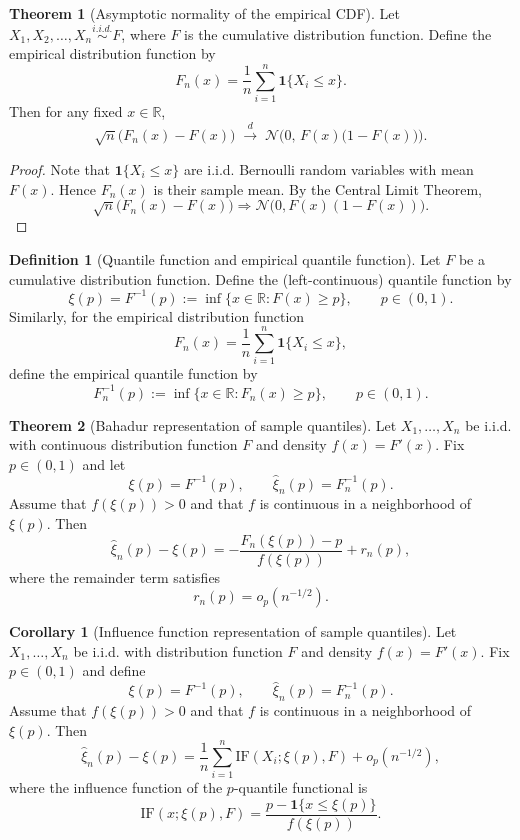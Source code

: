 \documentclass[11pt]{article}
\theoremstyle{definition}
\newtheorem{defn}{Definition}[section]
\newtheorem{theo}{Theorem}[section]
\newtheorem{corollary}{Corollary}[section]
\begin{document}
\begin{theo}[Asymptotic normality of the empirical CDF]
Let $X_1, X_2, \dots, X_n \stackrel{i.i.d.}{\sim} F$, where $F$ is the cumulative distribution function.
Define the empirical distribution function by
\[
F_n(x) = \frac{1}{n} \sum_{i=1}^n \mathbf{1}\{X_i \le x\}.
\]
Then for any fixed $x \in \mathbb{R}$,
\[
\sqrt{n}\big(F_n(x) - F(x)\big)
\;\xrightarrow{d}\;
\mathcal{N}\big(0,\, F(x)\big(1 - F(x)\big)\big).
\]
\end{theo}
\begin{proof}
Note that $\mathbf{1}\{X_i \le x\}$ are i.i.d. Bernoulli random variables with mean $F(x)$.
Hence $F_n(x)$ is their sample mean. By the Central Limit Theorem,
\[
\sqrt{n}\big(F_n(x) - F(x)\big)
\Rightarrow \mathcal{N}\big(0, F(x)(1-F(x))\big).
\]
\end{proof}
\begin{defn}[Quantile function and empirical quantile function]
Let $F$ be a cumulative distribution function. Define the (left-continuous) quantile function by
\[
\xi(p) = F^{-1}(p)
:= \inf\{x \in \mathbb{R} : F(x) \ge p\},
\qquad p \in (0,1).
\]
Similarly, for the empirical distribution function
\[
F_n(x) = \frac{1}{n} \sum_{i=1}^n \mathbf{1}\{X_i \le x\},
\]
define the empirical quantile function by
\[
F_n^{-1}(p)
:= \inf\{x \in \mathbb{R} : F_n(x) \ge p\},
\qquad p \in (0,1).
\]
\end{defn}

\begin{theo}[Bahadur representation of sample quantiles]
Let $X_1,\dots,X_n$ be i.i.d. with continuous distribution function $F$ and density 
$f(x) = F'(x)$. Fix $p \in (0,1)$ and let 
\[
\xi(p) = F^{-1}(p), 
\qquad 
\hat{\xi}_n(p) = F_n^{-1}(p).
\]
Assume that $f(\xi(p)) > 0$ and that $f$ is continuous in a neighborhood of $\xi(p)$. 
Then
\[
\hat{\xi}_n(p) - \xi(p)
=
- \frac{F_n(\xi(p)) - p}{f(\xi(p))} 
+ r_n(p),
\]
where the remainder term satisfies
\[
r_n(p) = o_p(n^{-1/2}).
\]
\end{theo}
\begin{corollary}[Influence function representation of sample quantiles]
Let $X_1,\dots,X_n$ be i.i.d. with distribution function $F$ and density 
$f(x) = F'(x)$. Fix $p \in (0,1)$ and define
\[
\xi(p) = F^{-1}(p), 
\qquad 
\hat{\xi}_n(p) = F_n^{-1}(p).
\]
Assume that $f(\xi(p)) > 0$ and that $f$ is continuous in a neighborhood of $\xi(p)$. 
Then
\[
\hat{\xi}_n(p) - \xi(p)
=
\frac{1}{n} \sum_{i=1}^n \mathrm{IF}(X_i; \xi(p), F)
+ o_p(n^{-1/2}),
\]
where the influence function of the $p$-quantile functional is
\[
\mathrm{IF}(x; \xi(p), F)
=
\frac{p - \mathbf{1}\{x \le \xi(p)\}}{f(\xi(p))}.
\]
\end{corollary}
\end{document}
